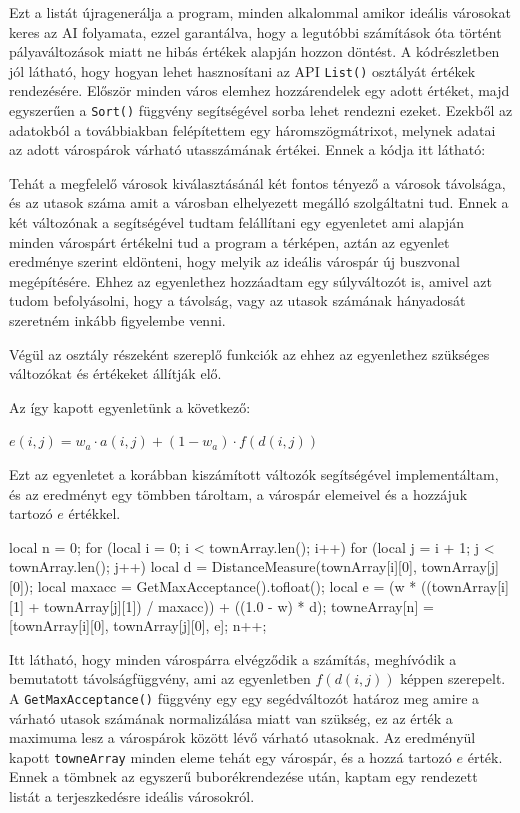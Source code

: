 Ezt a listát újragenerálja a program, minden alkalommal amikor ideális városokat keres az AI folyamata, ezzel garantálva, hogy a legutóbbi számítások óta történt pályaváltozások miatt ne hibás értékek alapján hozzon döntést. A kódrészletben jól látható, hogy hogyan lehet hasznosítani az API \texttt{List()} osztályát értékek rendezésére. Először minden város elemhez hozzárendelek egy adott értéket, majd egyszerűen a \texttt{Sort()} függvény segítségével sorba lehet rendezni ezeket. Ezekből az adatokból a továbbiakban felépítettem egy háromszögmátrixot, melynek adatai az adott várospárok várható utasszámának értékei. Ennek a kódja itt látható:

Tehát a megfelelő városok kiválasztásánál két fontos tényező a városok távolsága, és az utasok száma amit a városban elhelyezett megálló szolgáltatni tud. Ennek a két változónak a segítségével tudtam felállítani egy egyenletet ami alapján minden várospárt értékelni tud a program a térképen, aztán az egyenlet eredménye szerint eldönteni, hogy melyik az ideális várospár új buszvonal megépítésére. Ehhez az egyenlethez hozzáadtam egy súlyváltozót is, amivel azt tudom befolyásolni, hogy a távolság, vagy az utasok számának hányadosát szeretném inkább figyelembe venni.

Végül az osztály részeként szereplő funkciók az ehhez az egyenlethez szükséges változókat és értékeket állítják elő.

Az így kapott egyenletünk a következő:
\begin{center}
	$ e(i,j)=w_{a} \cdot a(i,j)+(1-w_{a}) \cdot f(d(i,j)) $
\end{center}

Ezt az egyenletet a korábban kiszámított változók segítségével implementáltam, és az eredményt egy tömbben tároltam, a várospár elemeivel és a hozzájuk tartozó $e$ értékkel.

\begin{cpp}
local n = 0;
for (local i = 0; i < townArray.len(); i++) {
  for (local j = i + 1; j < townArray.len(); j++) {
    local d = DistanceMeasure(townArray[i][0], townArray[j][0]);
    local maxacc = GetMaxAcceptance().tofloat();
    local e = (w * ((townArray[i][1] + townArray[j][1]) / maxacc))
      + ((1.0 - w) * d);
    towneArray[n] = [townArray[i][0], townArray[j][0], e];
    n++;
  }
}
\end{cpp}

Itt látható, hogy minden várospárra elvégződik a számítás, meghívódik a bemutatott távolságfüggvény, ami az egyenletben $f(d(i,j))$ képpen szerepelt. \\ A \texttt{GetMaxAcceptance()} függvény egy egy segédváltozót határoz meg amire a várható utasok számának normalizálása miatt van szükség, ez az érték a maximuma lesz a várospárok között lévő várható utasoknak. Az eredményül kapott \texttt{towneArray} minden eleme tehát egy várospár, és a hozzá tartozó $e$ érték. Ennek a tömbnek az egyszerű buborékrendezése után, kaptam egy rendezett listát a terjeszkedésre ideális városokról.

